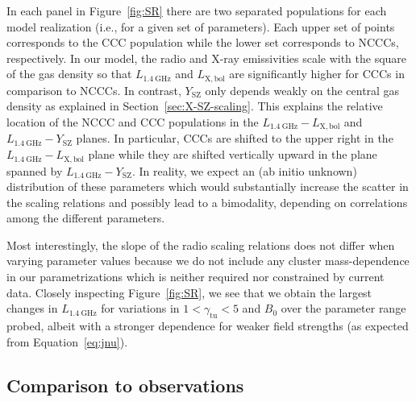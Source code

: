 \documentclass[traditabstract]{aa}
\newcommand{\rmn}{\mathrm}
\begin{document}
In each panel in Figure~\ref{fig:SR} there are two separated populations for
each model realization (i.e., for a given set of parameters). Each upper set of
points corresponds to the CCC population while the lower set corresponds to
NCCCs, respectively. In our model, the radio and X-ray emissivities scale with
the square of the gas density so that $L_{1.4~\rmn{GHz}}$ and $L_{\rmn{X,bol}}$
are significantly higher for CCCs in comparison to NCCCs. In contrast,
$Y_{\rmn{SZ}}$ only depends weakly on the central gas density as explained in
Section~\ref{sec:X-SZ-scaling}. This explains the relative location of the NCCC and
CCC populations in the $L_{1.4~\rmn{GHz}}-L_{\rmn{X,bol}}$ and
$L_{1.4~\rmn{GHz}}-Y_{\rmn{SZ}}$ planes. In particular, CCCs are shifted to the
upper right in the $L_{1.4~\rmn{GHz}}-L_{\rmn{X,bol}}$ plane while they are
shifted vertically upward in the plane spanned by
$L_{1.4~\rmn{GHz}}-Y_{\rmn{SZ}}$. In reality, we expect an (ab initio unknown)
distribution of these parameters which would substantially increase the scatter
in the scaling relations and possibly lead to a bimodality, depending on
correlations among the different parameters.

Most interestingly, the slope of the radio scaling relations does not differ
when varying parameter values because we do not include any cluster
mass-dependence in our parametrizations which is neither required nor
constrained by current data. Closely inspecting Figure~\ref{fig:SR}, we see that
we obtain the largest changes in $L_{1.4~\rmn{GHz}}$ for variations in
$1<\gamma_{\rmn{tu}}<5$ and $B_0$ over the parameter range probed, albeit with a
stronger dependence for weaker field strengths (as expected from
Equation~\ref{eq:jnu}).


\subsection{Comparison to observations}
\label{sec:scaling-obs}
\end{document}

